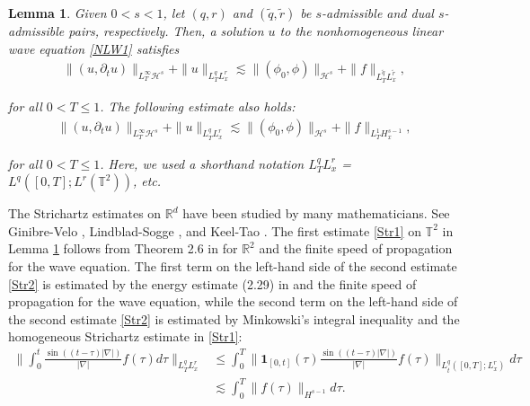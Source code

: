 \documentclass[letterpaper, 11pt,  reqno]{amsart}
\newtheorem{lemma}[theorem]{Lemma}
\newcommand{\1}{\hspace{0.5mm}\text{I}\hspace{0.5mm}}
\newcommand{\noi}{\noindent}
\newcommand{\R}{\mathbb{R}}
\newcommand{\T}{\mathbb{T}}
\newcommand{\nb}{\nabla}
\newcommand{\wt}{\widetilde}
\newcommand{\dt}{\partial_t}
\newcommand{\les}{\lesssim}
\newcommand{\ind}{\mathbf 1}
\renewcommand{\H}{\mathcal{H}}
\numberwithin{equation}{section}
\numberwithin{theorem}{section}
\newcommand{\noteherbert}[1]{\marginpar{\color{red} $\Leftarrow\Leftarrow\Leftarrow$}{\color{purple}Herbert: #1}}
\begin{document}
\begin{lemma}\label{LEM:Str}
Given $0 < s < 1$,
let $(q, r)$ and $(\wt q,\wt r)$
be $s$-admissible and dual $s$-admissible pairs, respectively. 
Then, a solution $u$ to the nonhomogeneous linear wave equation \eqref{NLW1}
satisfies
\begin{align}
\| (u, \dt u) \|_ {L^\infty_T \H^s } + 
 \| u  \|_{L^q_TL^r_x}
\lesssim 
\|(\phi_0, \phi) \|_{\H^s}  +  \| f \|_{L^{\wt q}_TL^{\wt r}_x},
\label{Str1}
\end{align}

\noi
for all $0 < T \leq 1$. 
The following estimate also holds:
\begin{align}
\| (u, \dt u) \|_ {L^\infty_T \H^s } 
+  \| u  \|_{L^q_TL^r_x}
\lesssim 
\|(\phi_0, \phi) \|_{\H^s}  +  \| f \|_{L^{1}_T H^{s-1}_x},
\label{Str2}
\end{align}

\noi
for all $0 < T \leq 1$.
Here, we used a shorthand notation
$L^q_TL^r_x$ = $L^q([0, T]; L^r(\T^2))$, etc.
\end{lemma}


The Strichartz estimates on $\R^d$ have been studied by many
mathematicians.  See Ginibre-Velo \cite{GV}, Lindblad-Sogge \cite{LS},
and Keel-Tao \cite{KeelTao}. 
 The first estimate \eqref{Str1} on $\T^2$ in Lemma \ref{LEM:Str} follows
from  Theorem 2.6 in 
\cite{TAO} for $\R^2$ 
and   the finite speed of propagation for the wave equation.
The first term on the left-hand side of  the second estimate \eqref{Str2} 
is estimated by   the energy estimate (2.29) in \cite{TAO}
and   the finite speed of propagation for the wave equation, 
while 
the second term on the left-hand side of the second estimate \eqref{Str2} 
is estimated by   Minkowski's integral inequality
and the homogeneous Strichartz estimate  in \eqref{Str1}: 
\begin{align*}
 \bigg\| \int_0^t \frac{\sin((t-\tau)|\nb|)}{|\nb|}f(\tau)d\tau  \bigg\|_{L^q_TL^r_x}  
&  \le   \int_0^T  \bigg\| \ind_{[0, t]}(\tau) \frac{\sin((t-\tau)|\nb|)}{|\nb|} f(\tau) \bigg\|_{L^q_t([0, T]; L^r_x)} d\tau
\\ 
& \les   \int_0^T \| f(\tau) \|_{H^{s-1}} d\tau. 
\end{align*}


%
%
%
%
\end{document}
